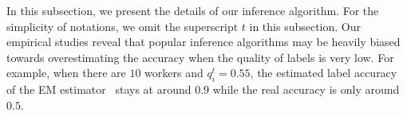 
In this subsection, we present the details of our inference algorithm. For the simplicity of notations, we omit the superscript $t$ in this subsection. Our empirical studies reveal that popular inference algorithms may be heavily biased towards overestimating the accuracy when the quality of labels is very low. For example, when there are $10$ workers and $q_i^t=0.55$, the estimated label accuracy of the EM estimator~\cite{dawid1979maximum,raykar2010learning} stays at around $0.9$ while the real accuracy is only around $0.5$.


